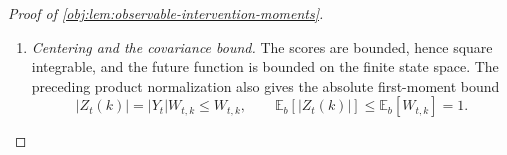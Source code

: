 \begin{proof}[Proof of \cref{obj:lem:observable-intervention-moments}]
\begin{enumerate}
For \(\mu,\mu'\in\Delta(\mathcal S)\), subtracting the midpoint of the range of \(f\) gives
\[
\begin{aligned}
\left|\sum_s(\mu(s)-\mu'(s))f(s)\right|
&=
\left|\sum_s(\mu(s)-\mu'(s))
\left(f(s)-\frac{\max f+\min f}{2}\right)\right|\\
&\le
\frac{\operatorname{osc}(f)}2
\sum_s|\mu(s)-\mu'(s)|\\
&=
\operatorname{osc}(f)\|\mu-\mu'\|_{\mathrm{TV}}.
\end{aligned}
\]
Applying
\cref{obj:ass:target-contraction,obj:ass:behavior-contraction}
to point masses shows that the total variation distance between any two rows of either matrix is at most \(\alpha\). Therefore,
\[
\begin{aligned}
|(P_ef)(s)-(P_ef)(s')|
&\le
\operatorname{osc}(f)
\|P_e(s,\cdot)-P_e(s',\cdot)\|_{\mathrm{TV}}
\le\alpha\operatorname{osc}(f),\\
|(P_bf)(s)-(P_bf)(s')|
&\le
\operatorname{osc}(f)
\|P_b(s,\cdot)-P_b(s',\cdot)\|_{\mathrm{TV}}
\le\alpha\operatorname{osc}(f).
\end{aligned}
\]
Taking the maximum over the two states and iterating, with the identity operator as the zero-step case, gives
\[
\operatorname{osc}(P_e^kr_e)
\le\alpha^k\operatorname{osc}(r_e)
\le\alpha^k
\le1.
\]
Applying the behavior iteration to this bound yields
\[
\operatorname{osc}(f_{\mathrm{future}})
=
\operatorname{osc}(P_b^{g_{\mathrm{gap}}}P_e^kr_e)
\le
\alpha^{g_{\mathrm{gap}}}\operatorname{osc}(P_e^kr_e)
\le\alpha^{g_{\mathrm{gap}}}.
\]

\item \emph{Centering and the covariance bound.}
The scores are bounded, hence square integrable, and the future function is bounded on the finite state space. The preceding product normalization also gives the absolute first-moment bound
\[
|Z_t(k)|=|Y_t|W_{t,k}\le W_{t,k},
\qquad
\mathbb E_b[|Z_t(k)|]\le\mathbb E_b[W_{t,k}]=1.
\]


\end{enumerate}
\end{proof}
